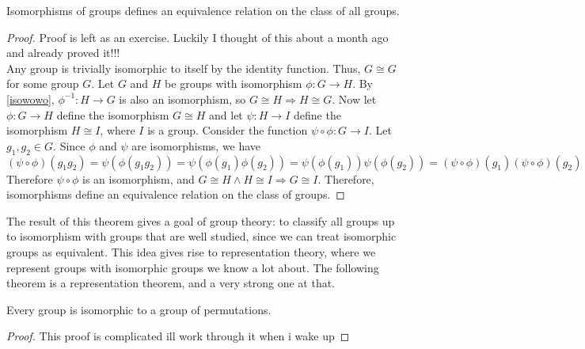 \documentclass[12pt, letterpaper]{report}
\begin{document}
\begin{theorem}
	Isomorphisms of groups defines an equivalence relation on the class of all groups.
\end{theorem}
\begin{proof}
	Proof is left as an exercise. Luckily I thought of this about a month ago and already proved it!!!\\
	Any group is trivially isomorphic to itself by the identity function. Thus, \(G\cong G\) for some group \(G\). Let \(G\) and \(H\) be groups with isomorphism \(\phi :G\to H\). By \ref{isowowo}, \(\phi ^{-1} :H\to G\) is also an isomorphism, so \(G\cong H \Longrightarrow H\cong G\). Now let \(\phi:G\to H \) define the isomorphism \(G\cong H\) and let \(\psi:H\to I \) define the isomorphism \(H\cong I\), where \(I\) is a group. Consider the function \(\psi \circ \phi :G\to I\). Let \(g_1,g_2\in G\). Since \(\phi \) and \(\psi \) are isomorphisms, we have 
	\[
		(\psi \circ \phi )(g_1 g_2)=\psi (\phi (g_1 g_2))=\psi (\phi (g_1)\phi (g_2))=\psi (\phi (g_1))\psi (\phi (g_2))=(\psi \circ \phi )(g_1)(\psi \circ \phi )(g_2)
	\]
	Therefore \(\psi \circ \phi \) is an isomorphism, and \(G\cong H \land H\cong I \Longrightarrow G\cong I\). Therefore, isomorphisms define an equivalence relation on the class of groups.
\end{proof}
The result of this theorem gives a goal of group theory: to classify all groups up to isomorphism with groups that are well studied, since we can treat isomorphic groups as equivalent. This idea gives rise to representation theory, where we represent groups with isomorphic groups we know a lot about. The following theorem is a representation theorem, and a very strong one at that.
\begin{theorem}[Cayley]
	Every group is isomorphic to a group of permutations.
\end{theorem}
\begin{proof}
	This proof is complicated ill work through it when i wake up
\end{proof}
\end{document}
